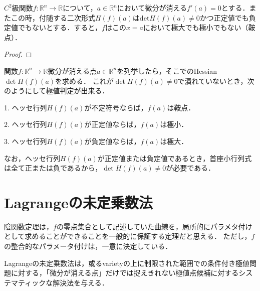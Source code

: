 \documentclass[uplatex, dvipdfmx]{jsreport}
\begin{document}
\begin{shadebox}\begin{proposition}[不定符号ならば鞍点]
    $C^2$級関数$f:\mathbb{R}^n\to\mathbb{R}$について，$a\in\mathbb{R}^n$において微分が消える$f'(a)=0$とする．またこの時，付随する二次形式$H(f)(a)$は\textbf{$\mathrm{det}H(f)(a)\ne 0$}かつ正定値でも負定値でもないとする．すると，$f$はこの$x=a$において極大でも極小でもない（鞍点）．
\end{proposition}\end{shadebox}
\begin{proof}
    
\end{proof}

\begin{screen}
    関数$f:\mathbb{R}^n\to\mathbb{R}$微分が消える点$a\in\mathbb{R}^n$を列挙したら，そこでのHessian $\det H(f)(a)$を求める．
    これが$\det H(f)(a)\ne 0$で潰れていないとき，次のようにして極値判定が出来る．

    1. ヘッセ行列$H(f)(a)$が不定符号ならば，$f(a)$は鞍点．

    2. ヘッセ行列$H(f)(a)$が正定値ならば，$f(a)$は極小．

    3. ヘッセ行列$H(f)(a)$が負定値ならば，$f(a)$は極大．

    なお，ヘッセ行列$H(f)(a)$が正定値または負定値であるとき，首座小行列式は全て正または負であるから，$\det H(f)(a)\ne 0$が必要である．
\end{screen}

\section{Lagrangeの未定乗数法}

陰関数定理は，$f$の零点集合として記述していた曲線を，局所的にパラメタ付けとして求めることができることを一般的に保証する定理だと思える．
ただし，$f$の整合的なパラメータ付けは，一意に決定している．

Lagrangeの未定乗数法は，或るvarietyの上に制限された範囲での条件付き極値問題に対する，「微分が消える点」だけでは捉えきれない極値点候補に対するシステマティックな解決法を与える．
\end{document}
